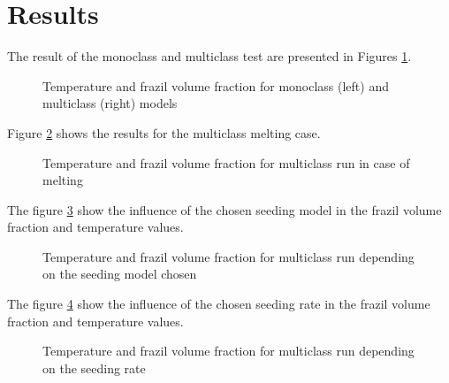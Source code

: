 \section{Results}

The result of the monoclass and multiclass test are presented in Figures \ref{fig:monoclass_TCf}.
\begin{figure}[H]
    \begin{center}
    \end{center}
    \caption{Temperature and frazil volume fraction for monoclass (left) and multiclass (right) models}
    \label{fig:monoclass_TCf}
\end{figure}
Figure \ref{fig:multiclass_TCf_melt} shows the results for the multiclass melting case.
\begin{figure}[H]
    \begin{center}
    \end{center}
    \caption{Temperature and frazil volume fraction for multiclass run in case of melting}
    \label{fig:multiclass_TCf_melt}
\end{figure}

The figure \ref{fig:seed} show the influence of the chosen seeding model in the frazil volume fraction and temperature values.
\begin{figure}[H]
    \begin{center}
    \end{center}
    \caption{Temperature and frazil volume fraction for multiclass run depending on the seeding model chosen}
    \label{fig:seed}
\end{figure}

The figure \ref{fig:seeding_rate} show the influence of the chosen seeding rate in the frazil volume fraction and temperature values.
\begin{figure}[H]
    \begin{center}
    \end{center}
    \caption{Temperature and frazil volume fraction for multiclass run depending on the seeding rate}
    \label{fig:seeding_rate}
\end{figure}

